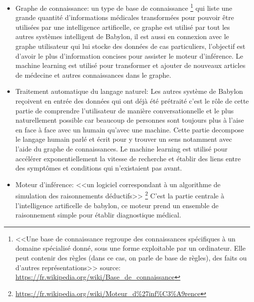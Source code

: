             \begin{itemize}
                \item Graphe de connaissance: un type de base de connaissance
                    \footnote{
                        <<Une base de connaissance regroupe des connaissances spécifiques à un 
                        domaine spécialisé donné, sous une forme exploitable par un ordinateur. 
                        Elle peut contenir des règles (dans ce cas, on parle de base de règles), 
                        des faits ou d'autres représentations>> \newline 
                        source: \url{https://fr.wikipedia.org/wiki/Base_de_connaissance}
                    }
                    qui liste une grande quantité d'informations médicales transformées 
                    pour pouvoir être utilisées par une intelligence artificelle, 
                    ce graphe est utilisé par tout les autres systèmes intelligent 
                    de Babylon, il est aussi en connexion avec le graphe utilisateur 
                    qui lui stocke des données de cas particuliers,
                    l'objectif est d'avoir le plus d'information concises 
                    pour assister le moteur d'inférence. 
                    Le machine learning est utilisé pour transformer et ajouter de nouveaux articles 
                    de médecine et autres connaissances dans le graphe.
                    \newline

                \item Traitement automatique du langage naturel: 
                Les autres système de Babylon reçoivent en entrée des données qui ont déjà 
                été prétraité c'est le rôle de cette partie de comprendre l'utilisateur 
                de manière conversationnelle et le plus naturellement possible car
                beaucoup de personnes sont toujours plus à l'aise en face à face 
                avec un humain qu'avec une machine. Cette partie decompose 
                le langage humain parlé et écrit pour y trouver un sens notamment avec l'aide 
                du graphe de connaissances. Le machine learning est utilisé pour accélérer exponentiellement 
                la vitesse de recherche et établir des liens entre des symptômes et conditions 
                qui n'existaient pas avant.
                \newline

                \item Moteur d'inférence: 
                <<un logiciel correspondant à un algorithme de simulation des raisonnements déductifs>>
                \footnote{\url{https://fr.wikipedia.org/wiki/Moteur_d\%27inf\%C3\%A9rence}}
                C'est la partie centrale à l'intelligence artificelle de babylon, ce moteur 
                prend un ensemble de raisonnement simple pour établir diagnostique médical.
                \newline
            \end{itemize} 
            \newpage


